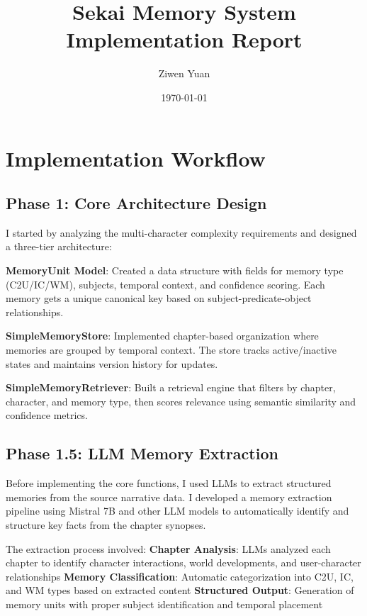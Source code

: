 \documentclass[11pt,a4paper]{article}
\begin{document}
\title{\Large\textbf{Sekai Memory System Implementation Report}}
\author{Ziwen Yuan}
\date{\today}
\maketitle

\section{Implementation Workflow}

\subsection{Phase 1: Core Architecture Design}

I started by analyzing the multi-character complexity requirements and designed a three-tier architecture:

\textbf{MemoryUnit Model}: Created a data structure with fields for memory type (C2U/IC/WM), subjects, temporal context, and confidence scoring. Each memory gets a unique canonical key based on subject-predicate-object relationships.

\textbf{SimpleMemoryStore}: Implemented chapter-based organization where memories are grouped by temporal context. The store tracks active/inactive states and maintains version history for updates.

\textbf{SimpleMemoryRetriever}: Built a retrieval engine that filters by chapter, character, and memory type, then scores relevance using semantic similarity and confidence metrics.

\subsection{Phase 1.5: LLM Memory Extraction}

Before implementing the core functions, I used LLMs to extract structured memories from the source narrative data. I developed a memory extraction pipeline using Mistral 7B and other LLM models to automatically identify and structure key facts from the chapter synopses.

The extraction process involved:
\textbf{Chapter Analysis}: LLMs analyzed each chapter to identify character interactions, world developments, and user-character relationships
\textbf{Memory Classification}: Automatic categorization into C2U, IC, and WM types based on extracted content
\textbf{Structured Output}: Generation of memory units with proper subject identification and temporal placement
\end{document}
